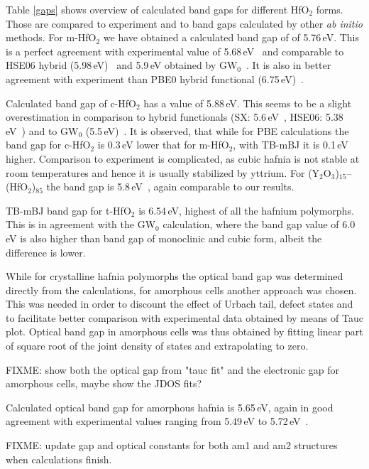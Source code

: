 \documentclass[10pt,a4paper,twocolumn]{article}
\begin{document}
Table \ref{gaps} shows overview of calculated band gaps for different HfO$_2$ forms.
Those are compared to experiment and to band gaps calculated by other \textit{ab initio} methods.
For m-HfO$_2$ we have obtained a calculated band gap of of 5.76\,eV.
This is a perfect agreement with experimental value of 5.68\,eV~\cite{Balog1977} and comparable to HSE06 hybrid (5.98\,eV)~\cite{Komsa2010} and 5.9\,eV obtained by GW$_0$~\cite{Gruning2010}.
It is also in better agreement with experiment than PBE0 hybrid functional (6.75\,eV)~\cite{Komsa2010}.

Calculated band gap of c-HfO$_2$ has a value of 5.88\,eV.
This seems to be a slight overestimation in comparison to hybrid functionals (SX: 5.6\,eV~\cite{Clark2010}, HSE06: 5.38\,eV~\cite{Yang2014}) and to GW$_0$ (5.5\,eV)~\cite{Gruning2010}.
It is observed, that while for PBE calculations the band gap for c-HfO$_2$ is 0.3\,eV lower that for m-HfO$_2$, with TB-mBJ it is 0.1\,eV higher.
Comparison to experiment is complicated, as cubic hafnia is not stable at room temperatures and hence it is usually stabilized by yttrium.
For (Y$_2$O$_3$)$_{15}$--(HfO$_2$)$_{85}$ the band gap is 5.8\,eV~\cite{Lim2002}, again comparable to our results.

TB-mBJ band gap for t-HfO$_2$ is 6.54\,eV, highest of all the hafnium polymorphs.
This is in agreement with the GW$_0$ calculation, where the band gap value of 6.0\,eV is also higher than band gap of monoclinic and cubic form, albeit the difference is lower.

While for crystalline hafnia polymorphs the optical band gap was determined directly from the calculations, for amorphous cells another approach was chosen.
This was needed in order to discount the effect of Urbach tail, defect states and to facilitate better comparison with experimental data obtained by means of Tauc plot.
Optical band gap in amorphous cells was thus obtained by fitting linear part of square root of the joint density of states and extrapolating to zero.

FIXME: show both the optical gap from "tauc fit" and the electronic gap for amorphous cells, maybe show the JDOS fits?

Calculated optical band gap for amorphous hafnia is 5.65\,eV, again in good agreement with experimental values ranging from 5.49\,eV to 5.72\,eV~\cite{Takeuchi2004, Nguyen2005, Perevalov2007}.

FIXME: update gap and optical constants for both am1 and am2 structures when calculations finish.
\end{document}
